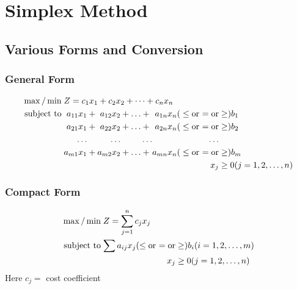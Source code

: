 \documentclass[../main-sheet.tex]{subfiles}
\begin{document}
\chapter{Simplex Method}
\section{Various Forms and Conversion}
\subsection{General Form}
\begin{align*}
    \max/\min         & \; Z= c_{1}x_{1} + c_{2}x_{2}+\dots + c_nx_n \\
    \text{subject to} & \;
    \begin{alignedat}[t]{5}
        a_{11}x_{1}&+{} &a_{12}x_{2}& +{} &\dots& +{} &a_{1n}x_n (& \leq \text{or } & = \text{or} & \geq) b_{1} \\
        a_{21}x_{1}&+{} &a_{22}x_{2}& +{} &\dots& +{} &a_{2n}x_n (& \leq \text{or } & = \text{or} & \geq) b_{2} \\
        \dots & &        \dots&  && \dots &          &         &         \dots &\\
        a_{m1}x_{1}&+{} &a_{m2}x_{2}& +{} &\dots& +{} &   a_{mn}x_n (& \leq \text{or } & = \text{or} &    \geq) b_m \\
        & &           &     &   &     &          &         &      x_j&  \geq0(j=1,2,\dots,n)
    \end{alignedat}
\end{align*}
\subsection{Compact Form}
\begin{align*}
    \max/\min         & \; Z=\sum_{j=1}^n c_j x_j \\
    \text{subject to} & \;
    \begin{alignedat}[t]{3}
        \sum a_{ij}x_{j}& (\leq \text{or } & = \text{or}& \geq) b_i(i=1,2,\dots,m) \\
        &  &                 x_j &\geq0(j=1,2,\dots,n)
    \end{alignedat}
\end{align*}
Here \(c_j=\) cost coefficient
\end{document}
